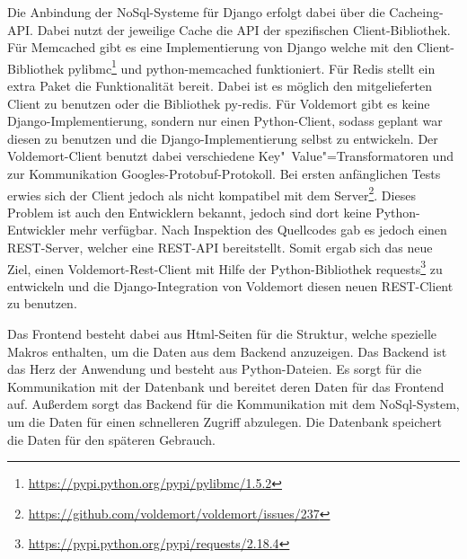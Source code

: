 Die Anbindung der NoSql-Systeme für Django erfolgt dabei über die Cacheing-API.
Dabei nutzt der jeweilige Cache die API der spezifischen Client-Bibliothek. Für
Memcached gibt es eine Implementierung von Django welche mit den
Client-Bibliothek
pylibmc\footnote{\url{https://pypi.python.org/pypi/pylibmc/1.5.2}} und
python-memcached funktioniert. Für Redis stellt ein extra Paket die
Funktionalität bereit. Dabei ist es möglich den mitgelieferten Client zu
benutzen oder die Bibliothek py-redis. Für Voldemort gibt es keine
Django-Implementierung, sondern nur einen Python-Client, sodass geplant war
diesen zu benutzen und die Django-Implementierung selbst zu entwickeln. Der
Voldemort-Client benutzt dabei verschiedene Key"~Value"=Transformatoren
und zur Kommunikation Googles-Protobuf-Protokoll. Bei ersten anfänglichen Tests
erwies sich der Client jedoch als nicht kompatibel mit dem
Server\footnote{\url{https://github.com/voldemort/voldemort/issues/237}}.
Dieses Problem ist auch den Entwicklern bekannt, jedoch sind dort keine
Python-Entwickler mehr verfügbar. Nach Inspektion des Quellcodes gab es jedoch
einen REST-Server, welcher eine REST-API bereitstellt. Somit ergab sich das
neue Ziel, einen Voldemort-Rest-Client mit Hilfe der Python-Bibliothek
requests\footnote{\url{https://pypi.python.org/pypi/requests/2.18.4}} zu
entwickeln und die Django-Integration von Voldemort diesen neuen REST-Client zu
benutzen.

Das Frontend besteht dabei aus Html-Seiten für die Struktur, welche spezielle
Makros enthalten, um die Daten aus dem Backend anzuzeigen. Das Backend ist das
Herz der Anwendung und besteht aus Python-Dateien. Es sorgt für die
Kommunikation mit der Datenbank und bereitet deren Daten für das Frontend auf.
Außerdem sorgt das Backend für die Kommunikation mit dem NoSql-System, um die
Daten für einen schnelleren Zugriff abzulegen. Die Datenbank speichert die Daten
für den späteren Gebrauch.
